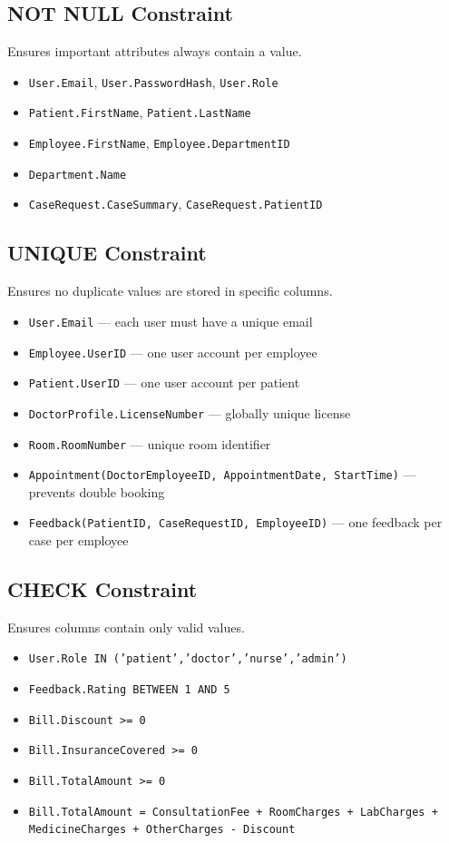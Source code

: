 \documentclass{article}
\begin{document}
\subsection{NOT NULL Constraint}
Ensures important attributes always contain a value.
\begin{itemize}[leftmargin=1.5cm]
  \item \texttt{User.Email}, \texttt{User.PasswordHash}, \texttt{User.Role}
  \item \texttt{Patient.FirstName}, \texttt{Patient.LastName}
  \item \texttt{Employee.FirstName}, \texttt{Employee.DepartmentID}
  \item \texttt{Department.Name}
  \item \texttt{CaseRequest.CaseSummary}, \texttt{CaseRequest.PatientID}
\end{itemize}

\subsection{UNIQUE Constraint}
Ensures no duplicate values are stored in specific columns.
\begin{itemize}[leftmargin=1.5cm]
  \item \texttt{User.Email} --- each user must have a unique email
  \item \texttt{Employee.UserID} --- one user account per employee
  \item \texttt{Patient.UserID} --- one user account per patient
  \item \texttt{DoctorProfile.LicenseNumber} --- globally unique license
  \item \texttt{Room.RoomNumber} --- unique room identifier
  \item \texttt{Appointment(DoctorEmployeeID, AppointmentDate, StartTime)} --- prevents double booking
  \item \texttt{Feedback(PatientID, CaseRequestID, EmployeeID)} --- one feedback per case per employee
\end{itemize}

\subsection{CHECK Constraint}
Ensures columns contain only valid values.
\begin{itemize}[leftmargin=1.5cm]
  \item \texttt{User.Role IN ('patient','doctor','nurse','admin')}
  \item \texttt{Feedback.Rating BETWEEN 1 AND 5}
  \item \texttt{Bill.Discount >= 0}
  \item \texttt{Bill.InsuranceCovered >= 0}
  \item \texttt{Bill.TotalAmount >= 0}
  \item \texttt{Bill.TotalAmount = ConsultationFee + RoomCharges + LabCharges + MedicineCharges + OtherCharges - Discount}
\end{itemize}
\end{document}
